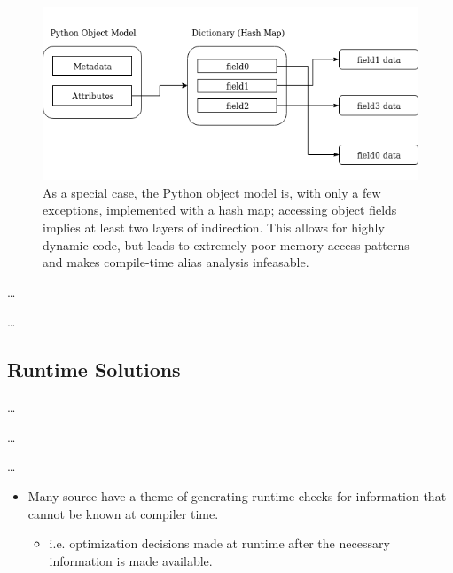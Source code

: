 \documentclass[nobib]{tufte-handout}
\newcommand{\placeholdertext}[1]{
	\noindent{\color{red}{#1}}
}
\begin{document}
\begin{figure}
\includegraphics[width=\linewidth]{images/PythonObjectModel.png}
\caption{As a special case, the Python object model is, with only a few exceptions, implemented with a hash map; accessing object fields implies at least two layers of indirection.  This allows for highly dynamic code, but leads to extremely poor memory access patterns and makes compile-time alias analysis infeasable.} 
\label{fig:PythonObjectModel}
\end{figure}


\placeholdertext{Software Prefetching (via code generation)} \ldots \newline

\placeholdertext{Loop fusion and reordering} \ldots \newline


\subsection{Runtime Solutions}
\placeholdertext{JIT compilation} \ldots \newline

\placeholdertext{Non-JIT runtime code modification} \ldots \newline

\placeholdertext{Non-trivial code generation (compile-time)} \ldots \newline
\begin{itemize}
	\item Many source have a theme of generating runtime checks for information that cannot be known at compiler time.	
	\begin{itemize}
		\item i.e. optimization decisions made at runtime after the necessary information is made available.
	\end{itemize}
\end{itemize}
\end{document}
